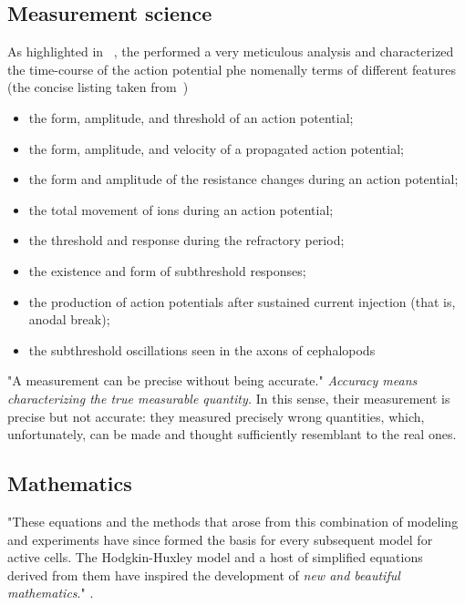 \subsection{Measurement science\label{sec:Physiology-HHPhilosophy}}

As highlighted in ~\cite{MechanisticModelHodgkinHuxleyCraver:2006}, the performed a very meticulous analysis
and characterized the time-course of the action potential phe
nomenally terms of different features (the concise listing taken from~\cite{MechanisticModelHodgkinHuxleyCraver:2006})

\begin{itemize}
\item the form, amplitude, and threshold of an action potential;
\item the form, amplitude, and velocity of a propagated action potential;
\item the form and amplitude of the resistance changes during an action potential;
\item the total movement of ions during an action potential;
\item the threshold and response during the refractory period;
\item the existence and form of subthreshold responses;
\item the production of action potentials after sustained current injection (that is,
anodal break);
\item the subthreshold oscillations seen in the axons of cephalopods
\end{itemize}


"A measurement can be precise without being accurate."\cite{JohnstonWuNeurophysiology:1995} \textit{Accuracy means characterizing 
the true measurable quantity.} In this sense, their measurement is precise but not accurate: they measured precisely wrong quantities, which, unfortunately, can be made and thought sufficiently resemblant to the real ones. 

\subsection{Mathematics\label{Physiology-HHMathematics}}
"These equations and the methods that arose from this combination of modeling and
experiments have since formed the basis for every subsequent model for active cells.
The Hodgkin-Huxley model and a host of simplified equations  derived from
them have inspired the development of \textit{new and beautiful mathematics}." \cite{MathNeuroscience:2010}.


